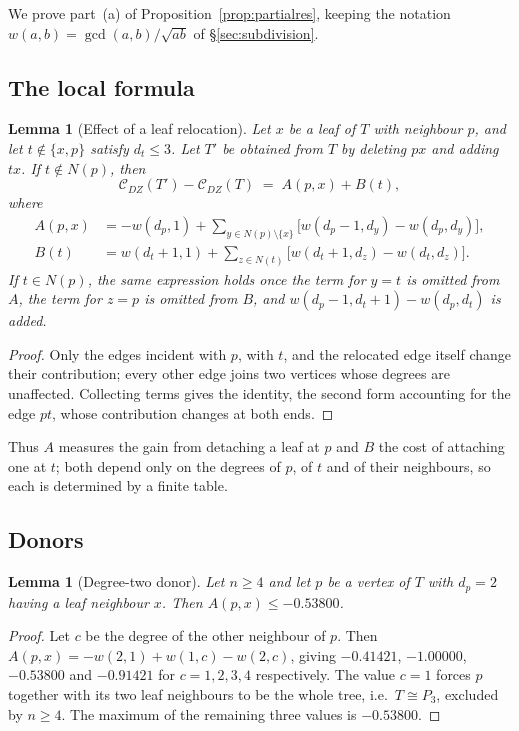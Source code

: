 \documentclass[11pt,a4paper]{article}
\theoremstyle{plain}
\newtheorem{lemma}[theorem]{Lemma}
\theoremstyle{definition}
\theoremstyle{remark}
\newcommand{\CDZ}{\mathcal{C}_{DZ}}
\newcommand{\gcdd}{\operatorname{gcd}}
\begin{document}
We prove part~(a) of Proposition~\ref{prop:partialres}, keeping the notation
$w(a,b)=\gcdd(a,b)/\sqrt{ab}$ of \S\ref{sec:subdivision}.

\subsection*{The local formula}

\begin{lemma}[Effect of a leaf relocation]
\label{lem:local}
Let $x$ be a leaf of $T$ with neighbour $p$, and let $t\notin\{x,p\}$ satisfy
$d_t\le3$. Let $T'$ be obtained from $T$ by deleting $px$ and adding $tx$. If
$t\notin N(p)$, then
\[
  \CDZ(T')-\CDZ(T)\;=\;A(p,x)+B(t),
\]
where
\begin{align*}
  A(p,x)&=-w(d_p,1)+\sum_{y\in N(p)\setminus\{x\}}
         \bigl[w(d_p-1,d_y)-w(d_p,d_y)\bigr],\\
  B(t)&=w(d_t+1,1)+\sum_{z\in N(t)}
         \bigl[w(d_t+1,d_z)-w(d_t,d_z)\bigr].
\end{align*}
If $t\in N(p)$, the same expression holds once the term for $y=t$ is omitted from
$A$, the term for $z=p$ is omitted from $B$, and $w(d_p-1,d_t+1)-w(d_p,d_t)$ is
added.
\end{lemma}

\begin{proof}
Only the edges incident with $p$, with $t$, and the relocated edge itself change
their contribution; every other edge joins two vertices whose degrees are
unaffected. Collecting terms gives the identity, the second form accounting for
the edge $pt$, whose contribution changes at both ends.
\end{proof}

Thus $A$ measures the gain from detaching a leaf at $p$ and $B$ the cost of
attaching one at $t$; both depend only on the degrees of $p$, of $t$ and of their
neighbours, so each is determined by a finite table.

\subsection*{Donors}

\begin{lemma}[Degree-two donor]
\label{lem:donorA}
Let $n\ge4$ and let $p$ be a vertex of $T$ with $d_p=2$ having a leaf neighbour
$x$. Then $A(p,x)\le-0.53800$.
\end{lemma}

\begin{proof}
Let $c$ be the degree of the other neighbour of $p$. Then
$A(p,x)=-w(2,1)+w(1,c)-w(2,c)$, giving $-0.41421$, $-1.00000$, $-0.53800$ and
$-0.91421$ for $c=1,2,3,4$ respectively. The value $c=1$ forces $p$ together
with its two leaf neighbours to be the whole tree, i.e.\ $T\cong P_3$, excluded
by $n\ge4$. The maximum of the remaining three values is $-0.53800$.
\end{proof}
\end{document}
